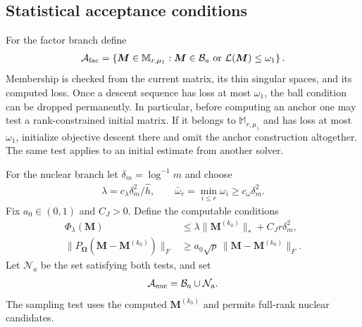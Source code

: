 \documentclass[numsec,webpdf,modern,large,namedate]{oup-authoring-template}
\theoremstyle{plain}
\theoremstyle{remark}
\newcommand{\M}{\bm{M}}
\newcommand{\bOmega}{\bm{\Omega}}
\newif\ifmarkchanges
\newenvironment{revision}{\begingroup\ifmarkchanges\color{red}\fi}{\endgroup}
\begin{document}
\begin{revision}
\subsection{Statistical acceptance conditions}
\label{sec:acceptance_conditions}
For the factor branch define
\begin{align}
 \mathcal A_{\rm fac}
 =\left\{\M\in\mathbb M_{r,\mu_1}:
       \M\in\mathcal B_a\ \text{or}\ \mathcal L(\M)\le\omega_1\right\}.
 \label{eq:of_factor_acceptance}
\end{align}
Membership is checked from the current matrix, its thin singular spaces,
and its computed loss.  Once a descent sequence has loss at most
$\omega_1$, the ball condition can be dropped permanently.
In particular, before computing an anchor one may test a rank-constrained initial matrix.
If it belongs to $\mathbb M_{r,\mu_1}$ and has loss at most $\omega_1$, initialize
objective descent there and omit the anchor construction altogether.
The same test applies to an initial estimate from another solver.

For the nuclear branch let $\delta_m=\log^{-1}m$ and choose
\begin{align}
 \lambda=c_\lambda\delta_m^2/\widehat h,
 \qquad \bar\omega_r=\min_{i\le r}\omega_i\ge c_\omega\delta_m^2.
 \label{eq:of_nuclear_tuning}
\end{align}
Fix $a_0\in(0,1)$ and $C_J>0$.  Define the computable conditions
\begin{align}
 \Phi_\lambda(\M)&\le
       \lambda\|\M^{(k_0)}\|_*+C_Jr\delta_m^2,
       \label{eq:of_nuclear_level_test}\\
 \|P_{\bOmega}(\M-\M^{(k_0)})\|_F
       &\ge a_0\sqrt p\,\|\M-\M^{(k_0)}\|_F.
       \label{eq:of_nuclear_sampling_test}
\end{align}
Let $\mathcal N_a$ be the set satisfying both tests, and set
\begin{align}
 \mathcal A_{\rm nuc}=\mathcal B_a\cup\mathcal N_a.
 \label{eq:of_nuclear_acceptance}
\end{align}
The sampling test uses the computed $\M^{(k_0)}$ and permits
full-rank nuclear candidates.


\end{revision}
\end{document}
